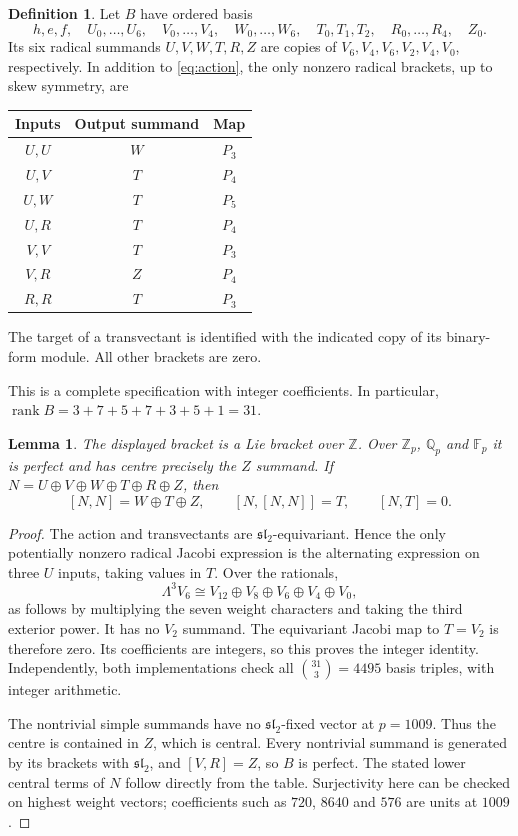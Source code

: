 \documentclass[11pt]{article}
\newtheorem{lemma}[theorem]{Lemma}
\theoremstyle{definition}\newtheorem{definition}[theorem]{Definition}
\theoremstyle{remark}\newtheorem{remark}[theorem]{Remark}
\DeclareMathOperator{\rank}{rank}
\newcommand{\Zp}{\mathbb Z_p}
\newcommand{\Qp}{\mathbb Q_p}
\newcommand{\Fp}{\mathbb F_p}
\begin{document}
\begin{definition}\label{def:B}
Let $B$ have ordered basis
\[
 h,e,f,\quad U_0,\ldots,U_6,\quad V_0,\ldots,V_4,\quad
 W_0,\ldots,W_6,\quad T_0,T_1,T_2,\quad R_0,\ldots,R_4,\quad Z_0.
\]
Its six radical summands $U,V,W,T,R,Z$ are copies of
$V_6,V_4,V_6,V_2,V_4,V_0$, respectively. In addition to
\eqref{eq:action}, the only nonzero radical brackets, up to skew symmetry, are
\begin{center}
\begin{tabular}{ccc}
\toprule Inputs & Output summand & Map \\ \midrule
$U,U$ & $W$ & $P_3$ \\
$U,V$ & $T$ & $P_4$ \\
$U,W$ & $T$ & $P_5$ \\
$U,R$ & $T$ & $P_4$ \\
$V,V$ & $T$ & $P_3$ \\
$V,R$ & $Z$ & $P_4$ \\
$R,R$ & $T$ & $P_3$ \\
\bottomrule
\end{tabular}
\end{center}
The target of a transvectant is identified with the indicated copy of its
binary-form module. All other brackets are zero.
\end{definition}
This is a complete specification with integer coefficients. In particular,
$\rank B=3+7+5+7+3+5+1=31$.

\begin{lemma}\label{lem:basic}
The displayed bracket is a Lie bracket over $\mathbb Z$. Over $\Zp$, $\Qp$
and $\Fp$ it is perfect and has centre precisely the $Z$ summand. If
$N=U\oplus V\oplus W\oplus T\oplus R\oplus Z$, then
\[
 [N,N]=W\oplus T\oplus Z,\qquad [N,[N,N]]=T,\qquad [N,T]=0.
\]
\end{lemma}
\begin{proof}
The action and transvectants are $\mathfrak{sl}_2$-equivariant. Hence the only
potentially nonzero radical Jacobi expression is the alternating expression
on three $U$ inputs, taking values in $T$. Over the rationals,
\[
 \Lambda^3 V_6\cong V_{12}\oplus V_8\oplus V_6\oplus V_4\oplus V_0,
\]
as follows by multiplying the seven weight characters and taking the third
exterior power. It has no $V_2$ summand. The equivariant Jacobi map to $T=V_2$
is therefore zero. Its coefficients are integers, so this proves the
integer identity. Independently, both implementations check all
$\binom{31}{3}=4495$ basis triples, with integer arithmetic.

The nontrivial simple summands have no $\mathfrak{sl}_2$-fixed vector at
$p=1009$. Thus the centre is contained in $Z$, which is central. Every
nontrivial summand is generated by its brackets with $\mathfrak{sl}_2$, and
$[V,R]=Z$, so $B$ is perfect. The stated lower central terms of $N$ follow
directly from the table. Surjectivity here can be checked on highest weight
vectors; coefficients such as $720$, $8640$ and $576$ are units at $1009$.
\end{proof}
\end{document}
